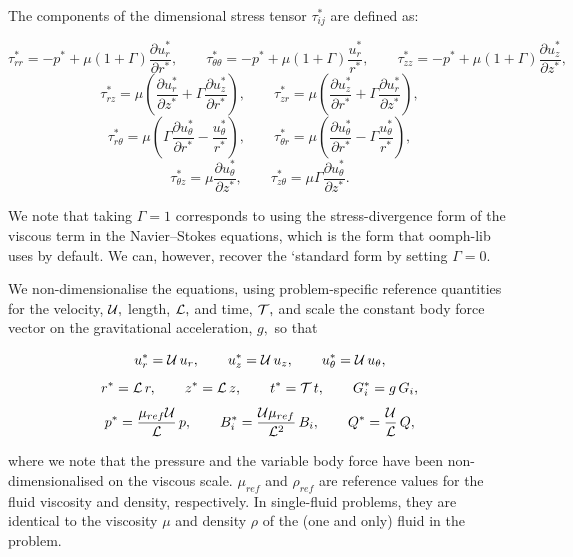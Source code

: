 The components of the dimensional stress tensor $ \tau_{ij}^* $ are defined as\+:

\begin{center} \[ \tau_{rr}^* = -p^* + \mu (1+\Gamma) \frac{\partial u_r^*}{\partial r^*}, \qquad \tau_{\theta\theta}^* = -p^* + \mu (1+\Gamma) \frac{u_r^*}{r^*}, \qquad \tau_{zz}^* = -p^* + \mu (1+\Gamma) \frac{\partial u_z^*}{\partial z^*}, \] \[ \tau_{rz}^* = \mu \left( \frac{\partial u_r^*}{\partial z^*} + \Gamma \frac{\partial u_z^*}{\partial r^*} \right), \qquad \tau_{zr}^* = \mu \left( \frac{\partial u_z^*}{\partial r^*} + \Gamma \frac{\partial u_r^*}{\partial z^*} \right), \] \[ \tau_{r \theta}^* = \mu \left( \Gamma \frac{\partial u_{\theta}^*}{\partial r^*} - \frac{u_{\theta}^*}{r^*} \right), \qquad \tau_{\theta r}^* = \mu \left( \frac{\partial u_{\theta}^*}{\partial r^*} - \Gamma \frac{u_{\theta}^*}{r^*} \right), \] \[ \tau_{\theta z}^* = \mu \frac{\partial u_{\theta}^*}{\partial z^*}, \qquad \tau_{z \theta}^* = \mu \Gamma \frac{\partial u_{\theta}^*}{\partial z^*}. \] \end{center} 

We note that taking $ \Gamma=1 $ corresponds to using the stress-\/divergence form of the viscous term in the Navier--Stokes equations, which is the form that {\ttfamily oomph-\/lib} uses by default. We can, however, recover the `standard\textquotesingle{} form by setting $ \Gamma=0 $.

We non-\/dimensionalise the equations, using problem-\/specific reference quantities for the velocity, $ {\cal U},$ length, $ {\cal L}, $ and time, ${\cal T},$ and scale the constant body force vector on the gravitational acceleration, $ g, $ so that \begin{center} \[ u_r^* = {\cal U} \, u_r, \qquad u_z^* = {\cal U} \, u_z, \qquad u_\theta^* = {\cal U} \, u_\theta, \] \[ r^* = {\cal L} \, r, \qquad z^* = {\cal L} \, z, \qquad t^* = {\cal T} \, t, \qquad G_i^* = g \, G_i, \] \[ p^* = \frac{\mu_{ref} {\cal U}}{{\cal L}} \, p, \qquad B_i^* = \frac{{\cal U}\mu_{ref}}{{\cal L}^2} \, B_i, \qquad Q^* = \frac{{\cal U}}{{\cal L}}\, Q, \] \end{center}  where we note that the pressure and the variable body force have been non-\/dimensionalised on the viscous scale. $ \mu_{ref} $ and $ \rho_{ref} $ are reference values for the fluid viscosity and density, respectively. In single-\/fluid problems, they are identical to the viscosity $ \mu $ and density $ \rho $ of the (one and only) fluid in the problem.


